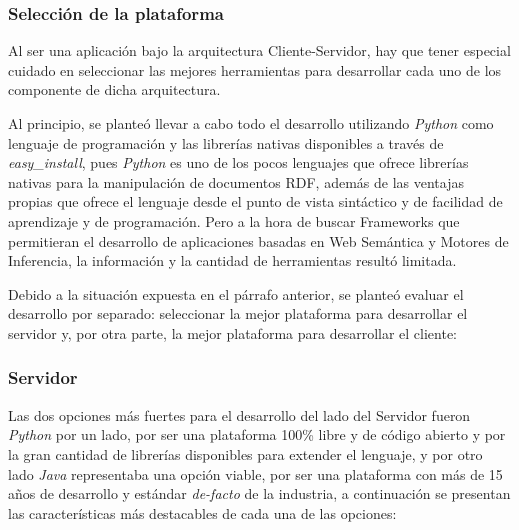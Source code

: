 \subsubsection{Selección de la plataforma}
Al ser una aplicación bajo la arquitectura Cliente-Servidor, hay que tener especial cuidado en seleccionar las mejores herramientas para desarrollar cada uno de los componente de dicha arquitectura.

Al principio, se planteó llevar a cabo todo el desarrollo utilizando \textit{Python} como lenguaje de programación y las librerías nativas disponibles a través de \textit{easy\_install}, pues \textit{Python} es uno de los pocos lenguajes que ofrece librerías nativas para la manipulación de documentos RDF, además de las ventajas propias que ofrece el lenguaje desde el punto de vista sintáctico y de facilidad de aprendizaje y de programación. Pero a la hora de buscar Frameworks que permitieran el desarrollo de aplicaciones basadas en Web Semántica y Motores de Inferencia, la información y la cantidad de herramientas resultó limitada.

Debido a la situación expuesta en el párrafo anterior, se planteó evaluar el desarrollo por separado: seleccionar la mejor plataforma para desarrollar el servidor y, por otra parte, la mejor plataforma para desarrollar el cliente:

\subsubsection{Servidor}
Las dos opciones más fuertes para el desarrollo del lado del Servidor fueron \textit{Python} por un lado, por ser una plataforma 100\% libre y de código abierto y por la gran cantidad de librerías disponibles para extender el lenguaje, y por otro lado \textit{Java} representaba una opción viable, por ser una plataforma con más de 15 años de desarrollo y estándar \textit{de-facto} de la industria, a continuación se presentan las características más destacables de cada una de las opciones:

